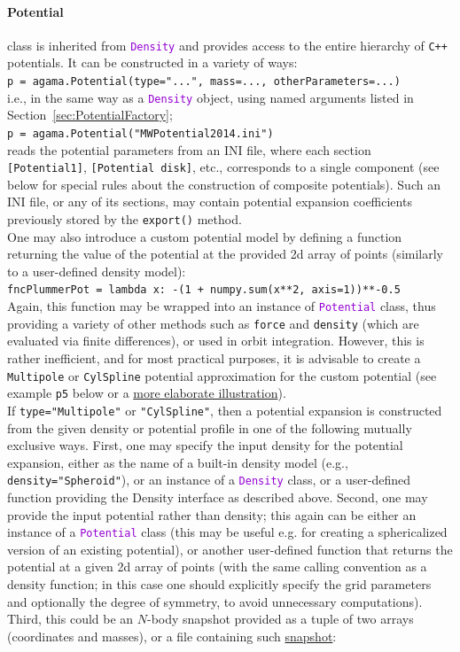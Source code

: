 \documentclass[12pt]{article}
\newcommand{\Cpp}  {\texttt{C++}\xspace}
\newcommand{\ttt}[1]{\textcolor{darkviolet}{\texttt{#1}}}
\newcommand{\ppp}[1]{\textcolor{darkolive} {\texttt{#1}}}
\begin{document}
\paragraph{Potential} \label{sec:PythonPotential} class is inherited from \ttt{Density} and provides access to the entire hierarchy of \Cpp potentials. It can be constructed in a variety of ways: \\
\texttt{p = agama.Potential(type="...", mass=..., otherParameters=...)}\\
i.e., in the same way as a \ttt{Density} object, using named arguments listed in Section~\ref{sec:PotentialFactory};\\
\texttt{p = agama.Potential("MWPotential2014.ini")}\\
reads the potential parameters from an INI file, where each section \ppp{[Potential1]}, \ppp{[Potential disk]}, etc., corresponds to a single component (see below for special rules about the construction of composite potentials). Such an INI file, or any of its sections, may contain potential expansion coefficients previously stored by the \texttt{export()} method. \\[2mm]
One may also introduce a custom potential model by defining a function returning the value of the potential at the provided 2d array of points (similarly to a user-defined density model):\\
\texttt{fncPlummerPot = lambda x: -(1 + numpy.sum(x**2, axis=1))**-0.5}\\
Again, this function may be wrapped into an instance of \ttt{Potential} class, thus providing a variety of other methods such as \texttt{force} and \texttt{density} (which are evaluated via finite differences), or used in orbit integration. However, this is rather inefficient, and for most practical purposes, it is advisable to create a \ppp{Multipole} or \ppp{CylSpline} potential approximation for the custom potential (see example \texttt{p5} below or a \hyperref[sec:ExampleSpiral]{more elaborate illustration}).\\[2mm]
If \ppp{type="Multipole"} or \ppp{"CylSpline"}, then a potential expansion is constructed from the given density or potential profile in one of the following mutually exclusive ways.
First, one may specify the input density for the potential expansion, either as the name of a built-in density model (e.g., \ppp{density="Spheroid"}), or an instance of a \ttt{Density} class, or a user-defined function providing the Density interface as described above. Second, one may provide the input potential rather than density; this again can be either an instance of a \ttt{Potential} class (this may be useful e.g. for creating a sphericalized version of an existing potential), or another user-defined function that returns the potential at a given 2d array of points (with the same calling convention as a density function; in this case one should explicitly specify the grid parameters and optionally the degree of symmetry, to avoid unnecessary computations). Third, this could be an $N$-body snapshot provided as a tuple of two arrays (coordinates and masses), or a file containing such \hyperref[sec:PythonSnapshot]{snapshot}:\\
\end{document}
